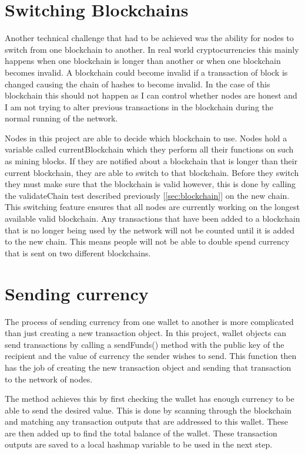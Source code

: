 \documentclass{l4proj}
\begin{document}
\section{Switching Blockchains}
Another technical challenge that had to be achieved was the ability for nodes to switch from one blockchain
to another. In real world cryptocurrencies this mainly happens when one blockchain is longer than another or
when one blockchain becomes invalid. A blockchain could become invalid if a transaction of block is changed 
causing the chain of hashes to become invalid. In the case of this blockchain this should not happen as I can
control whether nodes are honest and I am not trying to alter previous transactions in the blockchain during the normal
running of the network.

Nodes in this project are able to decide which blockchain to use. Nodes hold a variable called currentBlockchain
which they perform all their functions on such as mining blocks. If they are notified about a blockchain that is
longer than their current blockchain, they are able to switch to that blockchain. Before they switch they must 
make sure that the blockchain is valid however, this is done by calling the validateChain test described previously
[\ref{sec:blockchain}]
on the new chain. This switching feature ensures that all nodes are currently working on the longest available
valid blockchain. Any transactions that have been added to a blockchain that is no longer being used by the network
will not be counted until it is added to the new chain. This means people will not be able to double spend currency
that is sent on two different blockchains.

\section{Sending currency}
The process of sending currency from one wallet to another is more complicated than just creating a new transaction
object. In this project, wallet objects can send transactions by calling a sendFunds() method with
the public key of the recipient and the value of currency the sender wishes to send. This function then has the job of
creating the new transaction object and sending that transaction to the network of nodes.

The method achieves this by first checking the wallet has enough currency to be able to send the desired value.
This is done by scanning through the blockchain and matching any transaction outputs that are addressed to this 
wallet. These are then added up to find the total balance of the wallet. These transaction outputs are saved to a
local hashmap variable to be used in the next step.
\end{document}

